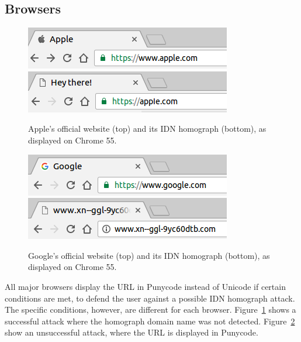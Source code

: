 \documentclass[letterpaper,twocolumn,10pt]{article}
\begin{document}
\subsection{Browsers}
\begin{figure}[t]
  \includegraphics[width=\linewidth]{images/apple}
  \includegraphics[width=\linewidth]{images/fakeapple-punycode}
  \centering
  \caption{Apple's official website (top) and its IDN homograph (bottom), as displayed on Chrome 55.}
  \label{screenshot-apple}
\end{figure}

\begin{figure}[t]
  \includegraphics[width=\linewidth]{images/google}
  \includegraphics[width=\linewidth]{images/fakegoogle-punycode}
  \centering
  \caption{Google's official website (top) and its IDN homograph (bottom), as displayed on Chrome 55.}
  \label{screenshot-google}
\end{figure}

All major browsers display the URL in Punycode instead of Unicode if certain conditions are met, to defend the user against a possible IDN homograph attack.
The specific conditions, however, are different for each browser.
Figure~\ref{screenshot-apple} shows a successful attack where the homograph domain name was not detected.
Figure~\ref{screenshot-google} show an unsuccessful attack, where the URL is displayed in Punycode.
\end{document}
